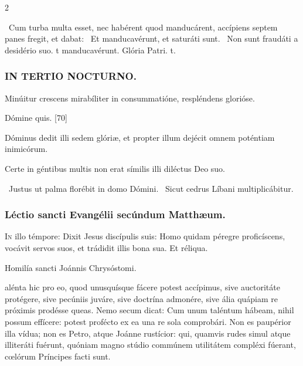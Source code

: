 \documentclass[9pt,twoside]{extarticle}
\begin{document}
\begin{multicols}{2}
\begin{tightlist}{}
\item {}~Cum turba multa esset, nec habérent quod manducárent, accípiens septem panes fregit, et dabat: \textred{*}~Et manducavérunt, et saturáti sunt. ~Non sunt fraudáti a desidério suo. t manducavérunt. Glória Patri. t.
\end{tightlist}

\subsubsection*{\center \textsc{IN TERTIO NOCTURNO.}}
\begin{tightlist}{}
\item {} Minúitur crescens mirabíliter in consummatióne, respléndens glorióse.
\item {} Dómine quis. [70]
\item {} Dóminus dedit illi sedem glóriæ, et propter illum dejécit omnem poténtiam inimicórum.
\item {} Certe in géntibus multis non erat símilis illi diléctus Deo suo.
\item {}~Justus ut palma florébit in domo Dómini. ~Sicut cedrus Líbani multiplicábitur.
\end{tightlist}

\subsubsection*{\center Léctio sancti Evangélii secúndum Matthæum.}
\begin{center} \hfill {}\end{center}
\lettrine{I}n illo témpore: Dixit Jesus discípulis suis: Homo quidam péregre proficíscens, vocávit servos suos, et trádidit illis bona sua. Et réliqua.

\begin{center}Homilía sancti Joánnis Chrysóstomi.\\
\end{center}
alénta hic pro eo, quod unusquísque fácere potest accípimus, sive auctoritáte protégere, sive pecúniis juváre, sive doctrína admonére, sive ália quápiam re próximis prodésse queas. Nemo secum dicat: Cum unum taléntum hábeam, nihil possum effícere: potest profécto ex ea una re sola comprobári. Non es paupérior illa vídua; non es Petro, atque Joánne rustícior: qui, quamvis rudes simul atque illiteráti fuérunt, quóniam magno stúdio commúnem utilitátem compléxi fúerant, cœlórum Príncipes facti sunt.


\end{multicols}
\end{document}
